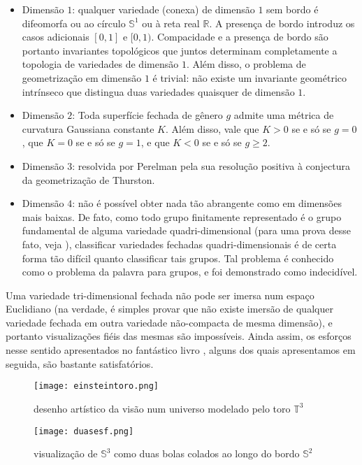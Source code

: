 \begin{itemize}
\item  Dimensão $1$: qualquer variedade (conexa) de dimensão $1$ sem bordo é difeomorfa ou ao círculo $\mathbb{S}^1$ ou à reta real $\mathbb{R}$. A presença de bordo introduz os casos adicionais $[0, 1]$ e $[0, 1)$. Compacidade e a presença de bordo são portanto invariantes topológicos que juntos determinam completamente a topologia de variedades de dimensão $1$. Além disso, o problema de geometrização em dimensão $1$ é trivial: não existe um invariante geométrico intrínseco que distingua duas variedades quaisquer de dimensão $1$. 
\item Dimensão $2$: Toda superfície fechada de gênero $g$ admite uma métrica de curvatura Gaussiana constante $K$. Além disso, vale que $K > 0$ se e só se $g = 0$, que $K = 0$ se e só se $g = 1$, e que $K < 0$ se e só se $g \geq 2$. 
\item Dimensão $3$: resolvida por Perelman pela sua resolução positiva à conjectura da geometrização de Thurston.
\item Dimensão $4$: não é possível obter nada tão abrangente como em dimensões mais baixas. De fato, como todo grupo finitamente representado é o grupo fundamental de alguma variedade quadri-dimensional (para uma prova desse fato, veja ), classificar variedades fechadas quadri-dimensionais é de certa forma tão difícil quanto classificar tais grupos. Tal problema é conhecido como o problema da palavra para grupos, e foi demonstrado como indecidível. 
\end{itemize}
Uma variedade tri-dimensional fechada não pode ser imersa num espaço Euclidiano (na verdade, é simples provar que não existe imersão de qualquer variedade fechada em outra variedade não-compacta de mesma dimensão), e portanto visualizações fiéis das mesmas são impossíveis. Ainda assim, os esforços nesse sentido apresentados no fantástico livro , alguns dos quais apresentamos em seguida, são bastante satisfatórios. 
\begin{figure}[H]
\centering
\texttt{[image: einsteintoro.png]}
\caption{desenho artístico da visão num universo modelado pelo toro $\mathbb{T}^3$}
\end{figure}

\begin{figure}[H]
\centering
\texttt{[image: duasesf.png]}
\caption{visualização de $\mathbb{S}^3$ como duas bolas colados ao longo do bordo $\mathbb{S}^2$}
\end{figure}

